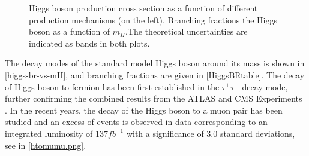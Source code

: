 \begin{figure}[ht]
\begin{subfigure}[b]{0.475\textwidth}
            \label{higgs-br-vs-mH}
        \end{subfigure}
        \caption[Higgs boson production cross section as a function of different production mechanisms (on the left). Branching fractions the Higgs boson as a function of $m_H$ .The theoretical uncertainties are indicated as bands in both plots.]
        {\small Higgs boson production cross section as a function of different production mechanisms\cite{higg-phen-3} (on the left). Branching fractions the Higgs boson as a function of $m_H$\cite{higgs-br-vs-mH}.The theoretical uncertainties are indicated as bands in both plots.}
\end{figure}

The decay modes of the standard model Higgs boson around its mass is shown in \autoref{higgs-br-vs-mH}, and branching fractions are given in \autoref{HiggsBRtable}. The decay of Higgs boson to fermion has been first established in the $\tau^+\tau^-$ decay mode\cite{CMS-PAS-HIG-16-043}, further confirming the combined results from the ATLAS and CMS Experiments \cite{Aad2016}. In the recent years, the decay of the Higgs boson to a muon pair has been studied and an excess of events is observed in data corresponding to an integrated luminosity of $137 fb^{-1}$ with a significance of 3.0 standard deviations\cite{CMS-PAS-HIG-19-006}, see in \autoref{htomumu.png}.

